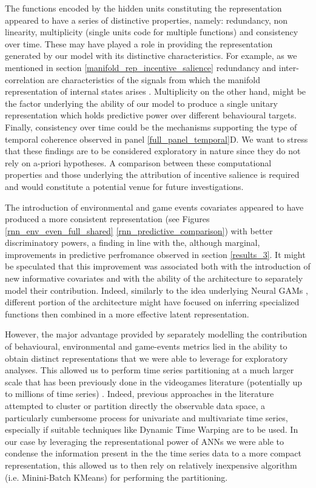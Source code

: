 The functions encoded by the hidden units constituting the representation appeared to have a series of distinctive properties, namely: redundancy, non linearity, multiplicity (single units code for multiple functions) and consistency over time. These may have played a role in providing the representation generated by our model with its distinctive characteristics. For example, as we mentioned in section \ref{manifold_rep_incentive_salience} redundancy and inter-correlation are characteristics of the signals from which the manifold representation of internal states arises \cite{seung2000manifold,gallego2017neural}. Multiplicity on the other hand, might be the factor underlying the ability of our model to produce a single unitary representation which holds predictive power over different behavioural targets. Finally, consistency over time could be the mechanisms supporting the type of temporal coherence observed in panel \ref{full_panel_temporal}D. We want to stress that these findings are to be considered exploratory in nature since they do not rely on a-priori hypotheses. A comparison between these computational properties and those underlying the attribution of incentive salience is required and would constitute a potential venue for future investigations. 

The introduction of environmental and game events covariates appeared to have produced a more consistent representation (see Figures \ref{rnn_env_even_full_shared} \ref{rnn_predictive_comparison}) with better discriminatory powers, a finding in line with the, although marginal, improvements in predictive perfromance observed in section \ref{results_3}. It might be speculated that this improvement was associated both with the introduction of new informative covariates and with the ability of the architecture to separately model their contribution. Indeed, similarly to the idea underlying Neural GAMs \cite{agarwal2021neural}, different portion of the architecture might have focused on inferring specialized functions then combined in a more effective latent representation.

However, the major advantage provided by separately modelling the contribution of behavioural, environmental and game-events metrics lied in the ability to obtain distinct representations that we were able to leverage for exploratory analyses. This allowed us to perform time series partitioning at a much larger scale that has been previously done in the videogames literature (potentially up to millions of time series) \cite{bauckhage2014clustering, makarovych2018like, vihanga2019weekly, aung2019trails}. Indeed, previous approaches in the literature attempted to cluster or partition directly the observable data space, a particularly cumbersome process for univariate and multivariate time series, especially if suitable techniques like Dynamic Time Warping \cite{muller2007dynamic} are to be used. In our case by leveraging the representational power of ANNs we were able to condense the information present in the the time series data to a more compact representation, this allowed us to then rely on relatively inexpensive algorithm (i.e. Minini-Batch KMeans) for performing the partitioning.

